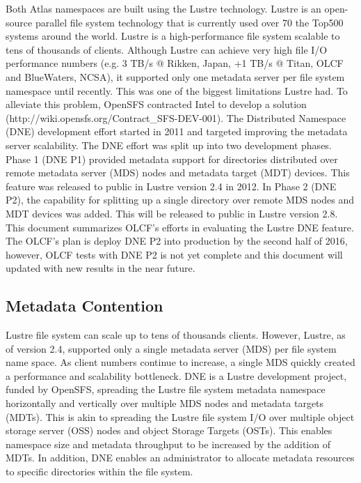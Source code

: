 \documentclass[conference,compsoc]{IEEEtran}
\begin{document}
Both Atlas namespaces are built using the Lustre technology. Lustre is an
open-source parallel file system technology that is currently used over 70%
the Top500 systems around the world. Lustre is a high-performance file system
scalable to tens of thousands of clients. Although Lustre can achieve very high
file I/O performance numbers (e.g. 3 TB/s @ Rikken, Japan, +1 TB/s @ Titan,
OLCF and BlueWaters, NCSA), it supported only one metadata server per file
system namespace until recently. This was one of the biggest limitations Lustre
had. To alleviate this problem, OpenSFS contracted Intel to develop a solution
(http://wiki.opensfs.org/Contract_SFS-DEV-001).  The Distributed Namespace
(DNE) development effort started in 2011 and targeted improving the metadata
server scalability.  The DNE effort was split up into two development phases.
Phase 1 (DNE P1) provided metadata support for directories distributed over
remote metadata server (MDS) nodes and metadata target (MDT) devices. This
feature was released to public in Lustre version 2.4 in 2012. In Phase 2 (DNE
P2), the capability for splitting up a single directory over remote MDS nodes
and MDT devices was added. This will be released to public in Lustre version
2.8.  This document summarizes OLCF’s efforts in evaluating the Lustre DNE
feature. The OLCF’s plan is deploy DNE P2 into production by the second half of
2016, however, OLCF tests with DNE P2 is not yet complete and this document
will updated with new results in the near future.

\subsection{Metadata Contention}

Lustre file system can scale up to tens of thousands clients. However, Lustre,
as of version 2.4, supported only a single metadata server (MDS) per file
system name space. As client numbers continue to increase, a single MDS quickly
created a performance and scalability bottleneck. DNE is a Lustre development
project, funded by OpenSFS, spreading the Lustre file system metadata namespace
horizontally and vertically over multiple MDS nodes and metadata targets
(MDTs). This is akin to spreading the Lustre file system I/O over multiple
object storage server (OSS) nodes and object Storage Targets (OSTs). This
enables namespace size and metadata throughput to be increased by the addition
of MDTs. In addition, DNE enables an administrator to allocate metadata
resources to specific directories within the file system. 
\end{document}
